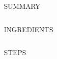 \begin{Page}

	\Banner[image={{IMAGE}}]

	\Details[%
		time={{TIME}},
		serves={{SERVINGS}},
	]
	
	\Spacer
	
	
	\begin{Summary}
		{{SUMMARY}}
	\end{Summary}

	\Spacer

	\begin{AutoColumns}%
		\begin{Column}[width=0.2]%
			\begin{Ingredients}
				{{INGREDIENTS}}
			\end{Ingredients}
		\end{Column}%
		\begin{Column}[width=0.8]%
			\begin{Steps}
				{{STEPS}}
			\end{Steps}
		\end{Column}%
	\end{AutoColumns}%

\end{Page}
